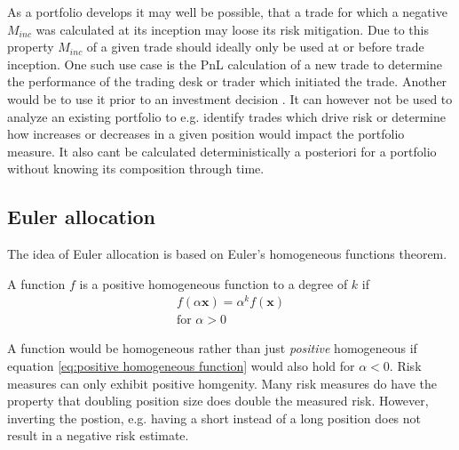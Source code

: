 \documentclass[../Thesis_AHoecherl.tex]{subfiles}
\begin{document}
As a portfolio develops it may well be possible, that a trade for which a negative $M_{inc}$ was calculated at its inception may loose its risk mitigation. 
Due to this property $M_{inc}$ of a given trade should ideally only be used at or before trade inception. 
One such use case is the PnL calculation of a new trade to determine the performance of the trading desk or trader which initiated the trade. 
Another would be to use it prior to an investment decision \cite{tibiletti2001incremental}. 
It can however not be used to analyze an existing portfolio to e.g. identify trades which drive risk or determine how increases or decreases in a given position would impact the portfolio measure. 
It also cant be calculated deterministically a posteriori for a portfolio without knowing its composition through time.


\subsection{Euler allocation}\label{sec:Euler allocation}

The idea of Euler allocation is based on Euler's homogeneous functions theorem. 

\begin{definition}
    A function $f$ is a positive homogeneous function to a degree of $k$ if 
    \begin{align} \label{eq:positive homogeneous function}
        f\left(\alpha \mathbf{x}\right) = \alpha^k f\left(\mathbf{x}\right) \\
        \text{for } \alpha >0
    \end{align}
\end{definition}

A function would be homogeneous rather than just \emph{positive} homogeneous if equation \ref{eq:positive homogeneous function} would also hold for $\alpha < 0$.
Risk measures can only exhibit positive homgenity. Many risk measures do have the property that doubling position size does double the measured risk. 
However, inverting the postion, e.g. having a short instead of a long position does not result in a negative risk estimate. 
\end{document}
